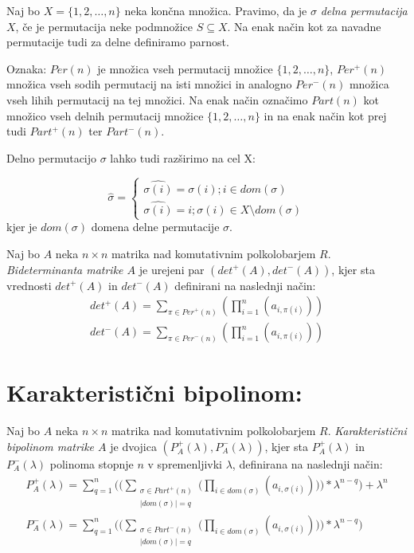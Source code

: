 \documentclass[mat1]{fmfdelo}
\newcommand{\abs}[1]{\ensuremath{\lvert #1 \rvert}}
\newcommand{\pojem}[1]{\emph{#1}}
\begin{document}
\begin{definicija}
	Naj bo $X=\{1, 2, \ldots, n\}$ neka končna množica. Pravimo, da je $\sigma$ \pojem{delna permutacija $X$}, če je permutacija neke podmnožice $S\subseteq X$. Na enak način kot za navadne permutacije tudi za delne definiramo parnost.
	
	Oznaka: $Per(n)$ je množica vseh permutacij množice $\{1, 2, \ldots, n\}$, $Per^{+}(n)$ množica vseh sodih permutacij na isti množici in analogno $Per^{-}(n)$ množica vseh lihih permutacij na tej množici. Na enak način označimo $Part(n)$ kot množico vseh delnih permutacij množice $\{1, 2, \ldots, n\}$ in na enak način kot prej tudi $Part^{+}(n)$ ter $Part^{-}(n)$.
	
	Delno permutacijo $\sigma$ lahko tudi razširimo na cel X:
	
	$$
	\hat{\sigma} = \begin{cases*}
		\hat{\sigma(i)} = \sigma(i); i\in dom(\sigma) \\
		\hat{\sigma(i)} = i; \sigma(i) \in X\setminus dom(\sigma)
	\end{cases*}
	$$
	kjer je $dom(\sigma)$ domena delne permutacije $\sigma$.
\end{definicija}
\pagebreak
\begin{definicija}
	Naj bo $A$ neka $n\times n$ matrika nad komutativnim polkolobarjem $R$. \pojem{Bideterminanta matrike $A$} je urejeni par $(det^{+}(A), det^{-}(A))$, kjer sta vrednosti $det^{+}(A)$ in $det^{-}(A)$ definirani na naslednji način:
	\begin{align*}
			det^{+}(A) = \sum_{\pi\in Per^{+}(n)}(\prod_{i = 1}^{n}(a_{i,\pi(i)})) \\
			det^{-}(A) = \sum_{\pi\in Per^{-}(n)}(\prod_{i = 1}^{n}(a_{i,\pi(i)}))
	\end{align*}
\end{definicija}

\section{Karakteristični bipolinom:}

\begin{definicija}
	Naj bo $A$ neka $n\times n$ matrika nad komutativnim polkolobarjem $R$. \pojem{Karakteristični bipolinom matrike $A$} je dvojica $(P^{+}_A(\lambda), P^{-}_A(\lambda))$, kjer sta $P^{+}_A(\lambda)$ in $P^{-}_A(\lambda)$ polinoma stopnje $n$ v spremenljivki $\lambda$, definirana na naslednji način:
	\begin{align*}
		P^{+}_A(\lambda) = \sum_{q = 1}^{n}\bigg(\bigg( \sum_{\substack{\sigma\in Part^{+}(n) \\ \abs{dom(\sigma)} = q}} \bigg(\prod_{i\in dom(\sigma)} (a_{i, \sigma(i)})\bigg)\bigg) *\lambda^{n-q}\bigg) + \lambda^n \\
		P^{-}_A(\lambda) = \sum_{q = 1}^{n}\bigg(\bigg( \sum_{\substack{\sigma\in Part^{-}(n) \\ \abs{dom(\sigma)} = q}} \bigg(\prod_{i\in dom(\sigma)} (a_{i, \sigma(i)})\bigg)\bigg) *\lambda^{n-q}\bigg)
	\end{align*}
\end{definicija}
\end{document}
